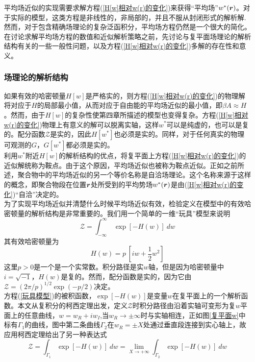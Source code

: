 平均场近似的实现需要求解方程(\ref{H[w]相对w(r)的变化})来获得“平均场”$w^*(\bm{r})$。对于实际的模型，这类方程是非线性的，非局部的，并且不服从封闭形式的解析解.然而，对于包含精确场理论的复杂泛函积分，平均场方程仍然是一个很大的简化。在讨论求解平均场方程的数值和近似解析策略之前，先讨论与复平面场理论的解析结构有关的一些一般性问题，以及方程(\ref{H[w]相对w(r)的变化})多解的存在性和意义。\\
\subsubsection{场理论的解析结构}
如果有效的哈密顿量$H[w]$是严格实的，则方程(\ref{H[w]相对w(r)的变化})的物理解将对应于$H$的局部最小值，从而对应于自由能的平均场近似的最小值，即$\beta A \approx H $。然而，由于$H[w]$的复杂性使第四章所描述的模型也变得复杂。方程(\ref{H[w]相对w(r)的变化})物理上有意义的解可以脱离实轴，这样$w^*$可以是纯虚的，也可以是复的。配分函数$\mathcal{Z}$是实的，因此$H[w^*]$也必须是实的。同样，对于任何真实的物理可观测的$G$，$G[w^*]$都必须是实的。\\

利用$w^*$附近$H[w]$的解析结构的优点，将复平面上方程(\ref{H[w]相对w(r)的变化})的近似解统称为鞍点。由于这个原因，平均场近似也被称为鞍点近似。正如之前所述，聚合物中的平均场近似的另一个等价名称是自洽场理论。这个名称来源于这样的概念，即聚合物段在位置$\bm{r}$处所受到的平均势场$w^*(\bm{r})$是由(\ref{H[w]相对w(r)的变化})“自洽”决定的。\\

为了实现平均场近似并清楚什么时候平均场近似有效，检验定义在模型中的有效哈密顿量的解析结构是非常重要的。我们用一个简单的一维“玩具”模型来说明\\
\begin{equation}
\mathcal{Z} = \int_{-\infty}^{\infty}\ \exp[-H(w)]\ dw \label{玩具模型}
\end{equation}
其有效哈密顿量为\\
 \begin{equation}
 H(w) = p \ \left[iw+ \frac{1}{2} w^2\right] \label{有效哈密顿量}
 \end{equation}
这里$p>0$是一个是一个实常数。积分路径是实$w$轴，但是因为哈密顿量中$i=\sqrt{-1}$，$H(w)$是复的。然而，配分函数是实的，因为它由$\mathcal{Z}=(2\pi/p)^{1/2} \exp(-p/2)$决定。\\

方程(\ref{玩具模型})的被积函数，$\exp[-H(w)]$是变量$w$在复平面上的一个解析函数。本文从复积分的柯西定理出发，定义$\mathcal{Z}$时积分路径由沿着实轴可变形为复$w$平面上的任意曲线，$w = w_R +iw_I$,当$w_R \rightarrow  \pm \infty$时与实轴相连，正如图\ref{复平面w}中标有$\Gamma_1$的曲线，图中第二条曲线$\Gamma_2$在$w_R=\pm X$处通过垂直段连接到实心轴上，故应用柯西定理给出了另一种表达式\\
\begin{equation}
\mathcal{Z} = \int_{\Gamma_1} \exp [-H(w)] \ dw = \lim_{X \rightarrow +\infty} \int_{\Gamma_2} \exp[-H(w)] \ dw   \label{Z的另一种表达式}
\end{equation}

